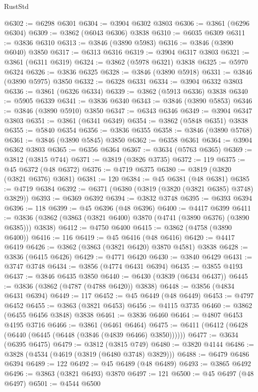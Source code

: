 \begin{lexlean}{RustStd}
\begin{coremodule}
@6302 := @6298 @6301
@6304 := @3904 @6302 @3803
@6306 := @3861 (@6296 @6304)
@6309 := @3862 (@6043 @6306) @3838
@6310 := @6035 @6309
@6311 := @3836 @6310
@6313 := @3846 (@3890 @5983)
@6316 := @3846 (@3890 @6040) @3850
@6317 := @6313 @6316
@6319 := @3904 @6317 @3803
@6321 := @3861 (@6311 @6319)
@6324 := @3862 (@5978 @6321) @3838
@6325 := @5970 @6324
@6326 := @3836 @6325
@6328 := @3846 (@3890 @5918)
@6331 := @3846 (@3890 @5975) @3850
@6332 := @6328 @6331
@6334 := @3904 @6332 @3803
@6336 := @3861 (@6326 @6334)
@6339 := @3862 (@5913 @6336) @3838
@6340 := @5905 @6339
@6341 := @3836 @6340
@6343 := @3846 (@3890 @5853)
@6346 := @3846 (@3890 @5910) @3850
@6347 := @6343 @6346
@6349 := @3904 @6347 @3803
@6351 := @3861 (@6341 @6349)
@6354 := @3862 (@5848 @6351) @3838
@6355 := @5840 @6354
@6356 := @3836 @6355
@6358 := @3846 (@3890 @5768)
@6361 := @3846 (@3890 @5845) @3850
@6362 := @6358 @6361
@6364 := @3904 @6362 @3803
@6365 := @6356 @6364
@6367 := @3634 (@5763 @6365)
@6369 := @3812 (@3815 @744)
@6371 := @3819 (@3826 @3735)
@6372 := 119
@6375 := @45 @6372 (@48 @6372)
@6376 := @4719 @6375
@6380 := @3819 (@3820 (@3821 @6376) @3681)
@6381 := 120
@6384 := @45 @6381 (@48 @6381)
@6385 := @4719 @6384
@6392 := @6371 (@6380 (@3819 (@3820 (@3821 @6385) @3748) @3829))
@6393 := @6369 @6392
@6394 := @3832 @3748
@6395 := @6393 @6394
@6396 := 118
@6399 := @45 @6396 (@48 @6396)
@6400 := @4417 @6399
@6411 := @3836 (@3862 (@3863 (@3821 @6400) @3870 (@4741 (@3890 @6376) (@3890 @6385))) @3838)
@6412 := @4750 @6400
@6415 := @3862 (@4758 (@3890 @6400))
@6416 := 116
@6419 := @45 @6416 (@48 @6416)
@6420 := @4417 @6419
@6426 := @3862 (@3863 (@3821 @6420) @3870 @4581) @3838
@6428 := @3836 (@6415 @6426)
@6429 := @4771 @6420
@6430 := @3840 @6429
@6431 := @3747 @3748
@6434 := @3856 (@4774 @6431 @6394)
@6435 := @3855 @4193
@6437 := @3846 @6435 @3850
@6440 := @6430 (@3839 (@6434 @6437))
@6445 := @3836 (@3862 (@4787 (@4788 @6420)) @3838)
@6448 := @3856 (@4834 @6431 @6394)
@6449 := 117
@6452 := @45 @6449 (@48 @6449)
@6453 := @4797 @6452
@6455 := @3863 (@3821 @6453)
@6456 := @4115 @3735
@6460 := @3862 (@6455 @6456 @3848) @3838
@6461 := @3836 @6460
@6464 := @4807 @6453 @4195 @3716
@6466 := @3861 (@6461 @6464)
@6475 := @6411 (@6412 (@6428 (@6440 (@6445 (@6448 (@3846 (@4839 @6466) @3850))))))
@6477 := @3634 (@6395 @6475)
@6479 := @3812 (@3815 @749)
@6480 := @3820 @4144
@6486 := @3828 (@4534 (@4619 (@3819 (@6480 @3748) @3829)))
@6488 := @6479 @6486 @6394
@6489 := 122
@6492 := @45 @6489 (@48 @6489)
@6493 := @3865 @6492
@6496 := @3863 (@3821 @6493) @3870
@6497 := 121
@6500 := @45 @6497 (@48 @6497)
@6501 := @4544 @6500

\end{coremodule}
\end{lexlean}
